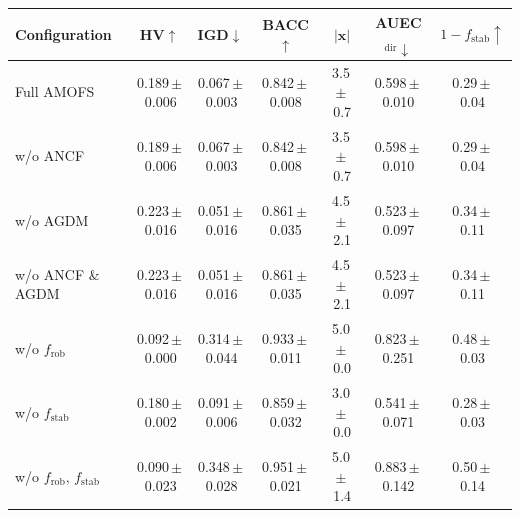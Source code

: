\begin{tabular}{lcccccc}
\toprule
Configuration & HV$\uparrow$ & IGD$\downarrow$ & BACC$\uparrow$ & $|\mathbf{x}|$ & AUEC$_{\mathrm{dir}}\downarrow$ & $1-f_{\mathrm{stab}}\uparrow$ \\
\midrule
Full AMOFS & 0.189\,$\pm$\,0.006 & 0.067\,$\pm$\,0.003 & 0.842\,$\pm$\,0.008 & 3.5\,$\pm$\,0.7 & 0.598\,$\pm$\,0.010 & 0.29\,$\pm$\,0.04 \\
w/o ANCF & 0.189\,$\pm$\,0.006 & 0.067\,$\pm$\,0.003 & 0.842\,$\pm$\,0.008 & 3.5\,$\pm$\,0.7 & 0.598\,$\pm$\,0.010 & 0.29\,$\pm$\,0.04 \\
w/o AGDM & 0.223\,$\pm$\,0.016 & 0.051\,$\pm$\,0.016 & 0.861\,$\pm$\,0.035 & 4.5\,$\pm$\,2.1 & 0.523\,$\pm$\,0.097 & 0.34\,$\pm$\,0.11 \\
w/o ANCF \& AGDM & 0.223\,$\pm$\,0.016 & 0.051\,$\pm$\,0.016 & 0.861\,$\pm$\,0.035 & 4.5\,$\pm$\,2.1 & 0.523\,$\pm$\,0.097 & 0.34\,$\pm$\,0.11 \\
w/o $f_{\mathrm{rob}}$ & 0.092\,$\pm$\,0.000 & 0.314\,$\pm$\,0.044 & 0.933\,$\pm$\,0.011 & 5.0\,$\pm$\,0.0 & 0.823\,$\pm$\,0.251 & 0.48\,$\pm$\,0.03 \\
w/o $f_{\mathrm{stab}}$ & 0.180\,$\pm$\,0.002 & 0.091\,$\pm$\,0.006 & 0.859\,$\pm$\,0.032 & 3.0\,$\pm$\,0.0 & 0.541\,$\pm$\,0.071 & 0.28\,$\pm$\,0.03 \\
w/o $f_{\mathrm{rob}}$, $f_{\mathrm{stab}}$ & 0.090\,$\pm$\,0.023 & 0.348\,$\pm$\,0.028 & 0.951\,$\pm$\,0.021 & 5.0\,$\pm$\,1.4 & 0.883\,$\pm$\,0.142 & 0.50\,$\pm$\,0.14 \\
\bottomrule
\end{tabular}
